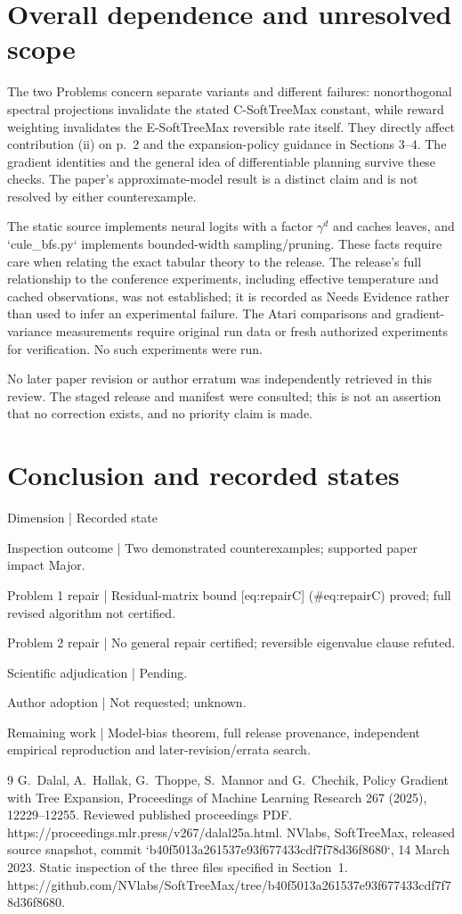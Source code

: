 \documentclass[10pt]{article}
\begin{document}
\section*{Overall dependence and unresolved scope}
The two Problems concern separate variants and different failures: nonorthogonal spectral projections invalidate the stated C-SoftTreeMax constant, while reward weighting invalidates the E-SoftTreeMax reversible rate itself. They directly affect contribution (ii) on p. 2 and the expansion-policy guidance in Sections 3–4. The gradient identities and the general idea of differentiable planning survive these checks. The paper’s approximate-model result is a distinct claim and is not resolved by either counterexample.\par
The static source implements neural logits with a factor \(\gamma^d\) and caches leaves, and `cule\_bfs.py` implements bounded-width sampling/pruning. These facts require care when relating the exact tabular theory to the release. The release’s full relationship to the conference experiments, including effective temperature and cached observations, was not established; it is recorded as Needs Evidence rather than used to infer an experimental failure. The Atari comparisons and gradient-variance measurements require original run data or fresh authorized experiments for verification. No such experiments were run.\par
No later paper revision or author erratum was independently retrieved in this review. The staged release and manifest were consulted; this is not an assertion that no correction exists, and no priority claim is made.\par
\section*{Conclusion and recorded states}
Dimension | Recorded state\par
Inspection outcome | Two demonstrated counterexamples; supported paper impact Major.\par
Problem 1 repair | Residual-matrix bound [eq:repairC] (\#eq:repairC) proved; full revised algorithm not certified.\par
Problem 2 repair | No general repair certified; reversible eigenvalue clause refuted.\par
Scientific adjudication | Pending.\par
Author adoption | Not requested; unknown.\par
Remaining work | Model-bias theorem, full release provenance, independent empirical reproduction and later-revision/errata search.\par
9 G. Dalal, A. Hallak, G. Thoppe, S. Mannor and G. Chechik, Policy Gradient with Tree Expansion, Proceedings of Machine Learning Research 267 (2025), 12229–12255. Reviewed published proceedings PDF. https://proceedings.mlr.press/v267/dalal25a.html. NVlabs, SoftTreeMax, released source snapshot, commit `b40f5013a261537e93f677433cdf7f78d36f8680`, 14 March 2023. Static inspection of the three files specified in Section 1. https://github.com/NVlabs/SoftTreeMax/tree/b40f5013a261537e93f677433cdf7f78d36f8680.\par
\end{document}
